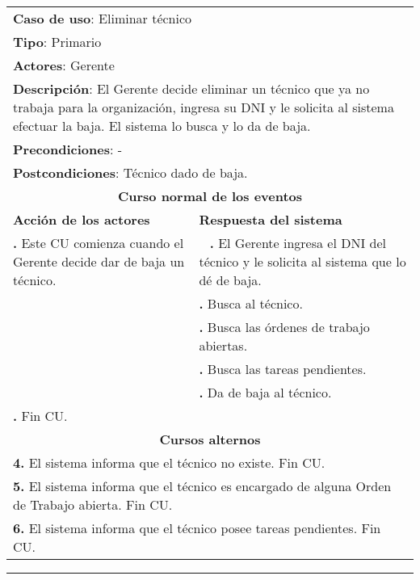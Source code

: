 \documentclass[12pt]{extarticle}
\begin{document}


    \newcommand\inc{\stepcounter{step}\textbf{\thestep. }}
    \newcommand\resetinc{\setcounter{step}{0}}

    \newcommand\raya{\noindent\rule{169mm}{0.8mm}\\}

	\begin{longtable}{ |p{8cm}|p{8cm}| }
		\hline
		\multicolumn{2}{|p{16cm}|}{\textbf{Caso de uso}: Eliminar técnico}\\
		\multicolumn{2}{|p{16cm}|}{\textbf{Tipo}: Primario}\\
		\multicolumn{2}{|p{16cm}|}{\textbf{Actores}: Gerente}\\
		\multicolumn{2}{|p{16cm}|}{\textbf{Descripción}: El Gerente decide eliminar un técnico que ya no trabaja para la organización, ingresa su DNI y le solicita al sistema efectuar la baja. El sistema lo busca y lo da de baja.}\\
		\multicolumn{2}{|p{16cm}|}{\textbf{Precondiciones}: -}\\
		\multicolumn{2}{|p{16cm}|}{\textbf{Postcondiciones}: Técnico dado de baja.}\\
		\hline
		\multicolumn{2}{|c|}{\textbf{Curso normal de los eventos}}\\
		\hline
		\textbf{Acción de los actores} & \textbf{Respuesta del sistema}\\
		\hline
			\inc Este CU comienza cuando el Gerente decide dar de baja un técnico. & \
			\hline
			\inc El Gerente ingresa el DNI del técnico y le solicita al sistema que lo dé de baja. & \\
			\hline
			& \inc Busca al técnico.\\
			\hline
			& \inc Busca las órdenes de trabajo abiertas. \\
			\hline
			& \inc Busca las tareas pendientes. \\
			\hline
			& \inc Da de baja al técnico.\\
			\hline
			\inc Fin CU. & \\
		\hline
		\multicolumn{2}{|c|}{\textbf{Cursos alternos}}\\
		\hline
		\multicolumn{2}{|p{16cm}|}{\textbf{4. }El sistema informa que el técnico no existe. Fin CU.}\\
		\hline
    \multicolumn{2}{|p{16cm}|}{\textbf{5. }El sistema informa que el técnico es encargado de alguna Orden de Trabajo abierta. Fin CU.}\\
		\hline
		\multicolumn{2}{|p{16cm}|}{\textbf{6. }El sistema informa que el técnico posee tareas pendientes. Fin CU.}\\
		\hline
	\end{longtable}

    \setcounter{step}{0}

    \noindent\rule{169mm}{0.8mm}\\
\end{document}
